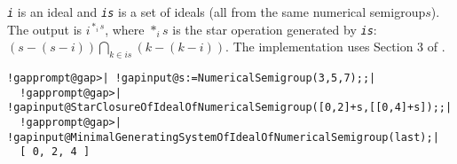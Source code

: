 \documentclass[a4paper,11pt]{report}
\begin{document}
{{{ \mbox{\texttt{\mdseries\slshape i}} is an ideal and \mbox{\texttt{\mdseries\slshape is}} is a set of ideals (all from the same numerical semigroup$s$). The output is $i^{*_is}$, where $*_is$ is the star operation generated by \mbox{\texttt{\mdseries\slshape is}}: $(s-(s-i))\bigcap_{k\in is} (k-(k-i))$. The implementation uses Section 3 of \cite{MR3354072}. 
\begin{Verbatim}[commandchars=!@|,fontsize=\small,frame=single,label=Example]
  !gapprompt@gap>| !gapinput@s:=NumericalSemigroup(3,5,7);;|
  !gapprompt@gap>| !gapinput@StarClosureOfIdealOfNumericalSemigroup([0,2]+s,[[0,4]+s]);;|
  !gapprompt@gap>| !gapinput@MinimalGeneratingSystemOfIdealOfNumericalSemigroup(last);|
  [ 0, 2, 4 ]
\end{Verbatim}
 }

 }

 }

 
\end{document}
